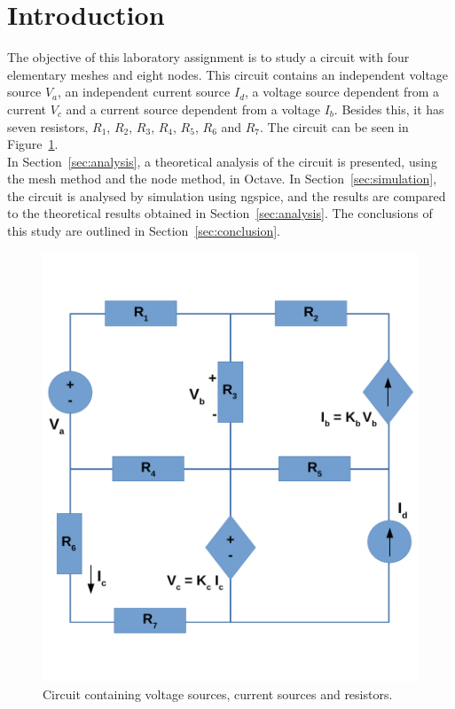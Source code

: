 \section{Introduction}
\label{sec:introduction}

The objective of this laboratory assignment is to study a circuit with four elementary meshes and eight nodes. 
This circuit contains an independent voltage source $V_a$, an independent current source $I_d$, 
a voltage source dependent from a current $V_c$ and a current source dependent from a voltage $I_b$.
Besides this, it has seven resistors, $R_1$, $R_2$, $R_3$, $R_4$, $R_5$, $R_6$ and $R_7$. The circuit can be seen in Figure~\ref{fig:Circuit}.\\
In Section~\ref{sec:analysis}, a theoretical analysis of the circuit is
presented, using the mesh method and the node method, in Octave. In Section~\ref{sec:simulation}, the circuit is analysed by
simulation using ngspice, and the results are compared to the theoretical results obtained in
Section~\ref{sec:analysis}. The conclusions of this study are outlined in
Section~\ref{sec:conclusion}.

\begin{figure}[h] \centering
\includegraphics[width=0.6\linewidth]{Circuit.pdf}
\caption{Circuit containing voltage sources, current sources and resistors.}
\label{fig:Circuit}
\end{figure}

